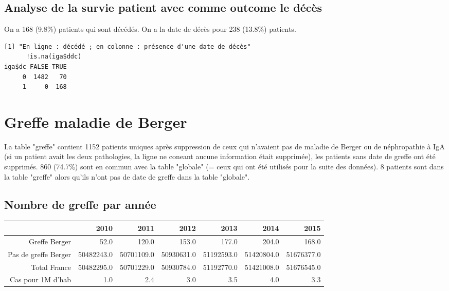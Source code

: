 \documentclass[11pt,a4paper]{article}\usepackage[]{graphicx}\usepackage[]{color}
\makeatletter
\newenvironment{kframe}{%
 \def\at@end@of@kframe{}%
 \ifinner\ifhmode%
  \def\at@end@of@kframe{\end{minipage}}%
  \begin{minipage}{\columnwidth}%
 \fi\fi%
 \def\FrameCommand##1{\hskip\@totalleftmargin \hskip-\fboxsep
 \colorbox{shadecolor}{##1}\hskip-\fboxsep
     \hskip-\linewidth \hskip-\@totalleftmargin \hskip\columnwidth}%
 \MakeFramed {\advance\hsize-\width
   \@totalleftmargin\z@ \linewidth\hsize
   \@setminipage}}%
 {\par\unskip\endMakeFramed%
 \at@end@of@kframe}
\newenvironment{knitrout}{}{} %
\makeatother
\begin{document}
  \subsection{Analyse de la survie patient avec comme outcome le décès}
  
  On a 168 (9.8\%) patients qui sont décédés. On a la date de décès pour 238 (13.8\%) patients.

\begin{knitrout}
\color{fgcolor}\begin{kframe}
\begin{verbatim}
[1] "En ligne : décédé ; en colonne : présence d'une date de décès"
      !is.na(iga$ddc)
iga$dc FALSE TRUE
     0  1482   70
     1     0  168
\end{verbatim}
\end{kframe}
\end{knitrout}

  
\section{Greffe maladie de Berger}

La table "greffe" contient 1152 patients uniques après suppression de ceux qui n'avaient pas de maladie de Berger ou de néphropathie à IgA (si un patient avait les deux pathologies, la ligne ne coneant aucune information était supprimée), les patients sans date de greffe ont été supprimés. 860 (74.7\%) sont en commun avec la table "globale" (= ceux qui ont été utilisés pour la suite des données). 8 patients sont dans la table "greffe" alors qu'ils n'ont pas de date de greffe dans la table "globale".

  \subsection{Nombre de greffe par année}

\begin{table}[ht]
\centering
\begin{tabular}{rrrrrrr}
  \hline
 & 2010 & 2011 & 2012 & 2013 & 2014 & 2015 \\ 
  \hline
Greffe Berger & 52.0 & 120.0 & 153.0 & 177.0 & 204.0 & 168.0 \\ 
  Pas de greffe Berger & 50482243.0 & 50701109.0 & 50930631.0 & 51192593.0 & 51420804.0 & 51676377.0 \\ 
  Total France & 50482295.0 & 50701229.0 & 50930784.0 & 51192770.0 & 51421008.0 & 51676545.0 \\ 
  Cas pour 1M d'hab & 1.0 & 2.4 & 3.0 & 3.5 & 4.0 & 3.3 \\ 
   \hline
\end{tabular}
\end{table}
\end{document}

